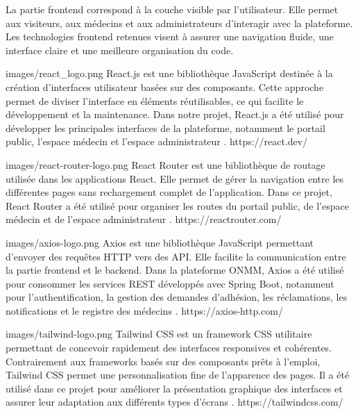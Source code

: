 ﻿\documentclass[12pt,a4paper]{report}
\begin{document}
La partie frontend correspond à la couche visible par l'utilisateur. Elle
permet aux visiteurs, aux médecins et aux administrateurs d'interagir avec la
plateforme. Les technologies frontend retenues visent à assurer une navigation
fluide, une interface claire et une meilleure organisation du code.

\techno
{images/react_logo.png}
{React.js}
{est une bibliothèque JavaScript destinée à la création d'interfaces
utilisateur basées sur des composants. Cette approche permet de diviser
l'interface en éléments réutilisables, ce qui facilite le développement et la
maintenance. Dans notre projet, React.js a été utilisé pour développer les
principales interfaces de la plateforme, notamment le portail public, l'espace
médecin et l'espace administrateur \cite{reactDocs}.}
{https://react.dev/}

\techno
{images/react-router-logo.png}
{React Router}
{est une bibliothèque de routage utilisée dans les applications React. Elle
permet de gérer la navigation entre les différentes pages sans rechargement
complet de l'application. Dans ce projet, React Router a été utilisé pour
organiser les routes du portail public, de l'espace médecin et de l'espace
administrateur \cite{reactRouterDocs}.}
{https://reactrouter.com/}

\techno
{images/axios-logo.png}
{Axios}
{est une bibliothèque JavaScript permettant d'envoyer des requêtes HTTP vers
des API. Elle facilite la communication entre la partie frontend et le backend.
Dans la plateforme ONMM, Axios a été utilisé pour consommer les services REST
développés avec Spring Boot, notamment pour l'authentification, la gestion des
demandes d'adhésion, les réclamations, les notifications et le registre des
médecins \cite{axiosDocs}.}
{https://axios-http.com/}

\techno
{images/tailwind-logo.png}
{Tailwind CSS}
{est un framework CSS utilitaire permettant de concevoir rapidement des
interfaces responsives et cohérentes. Contrairement aux frameworks basés sur
des composants prêts à l'emploi, Tailwind CSS permet une personnalisation
fine de l'apparence des pages. Il a été utilisé dans ce projet pour améliorer
la présentation graphique des interfaces et assurer leur adaptation aux
différents types d'écrans \cite{tailwindDocs}.}
{https://tailwindcss.com/}

\end{document}
